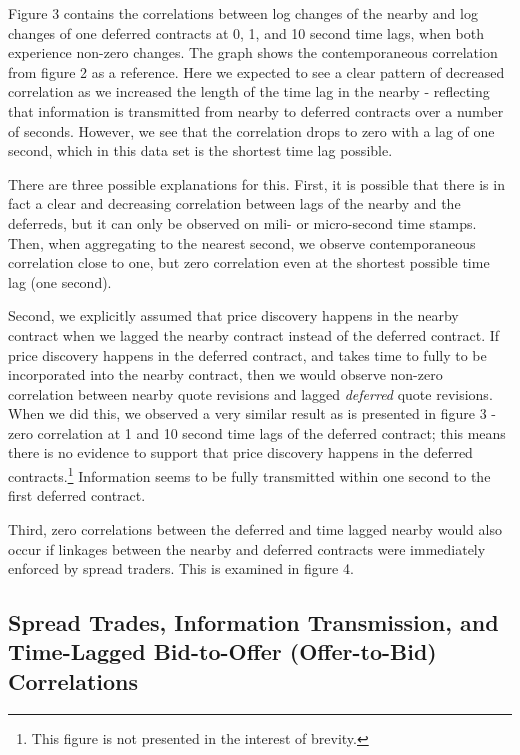 \documentclass[review,12pt]{elsarticle}
\begin{document}
Figure 3 contains the correlations between log changes of the nearby and
log changes of one deferred contracts at 0, 1, and 10 second time lags,
when both experience non-zero changes. The graph shows the
contemporaneous correlation from figure 2 as a reference. Here we
expected to see a clear pattern of decreased correlation as we increased
the length of the time lag in the nearby - reflecting that information
is transmitted from nearby to deferred contracts over a number of
seconds. However, we see that the correlation drops to zero with a lag
of one second, which in this data set is the shortest time lag possible.

There are three possible explanations for this. First, it is possible
that there is in fact a clear and decreasing correlation between lags of
the nearby and the deferreds, but it can only be observed on mili- or
micro-second time stamps. Then, when aggregating to the nearest second,
we observe contemporaneous correlation close to one, but zero
correlation even at the shortest possible time lag (one second).

Second, we explicitly assumed that price discovery happens in the nearby
contract when we lagged the nearby contract instead of the deferred
contract. If price discovery happens in the deferred contract, and takes
time to fully to be incorporated into the nearby contract, then we would
observe non-zero correlation between nearby quote revisions and lagged
\emph{deferred} quote revisions. When we did this, we observed a very
similar result as is presented in figure 3 - zero correlation at 1 and
10 second time lags of the deferred contract; this means there is no
evidence to support that price discovery happens in the deferred
contracts.\footnote{This figure is not presented in the interest of
  brevity.} Information seems to be fully transmitted within one second
to the first deferred contract.

Third, zero correlations between the deferred and time lagged nearby
would also occur if linkages between the nearby and deferred contracts
were immediately enforced by spread traders. This is examined in figure
4.

\subsection{Spread Trades, Information Transmission, and Time-Lagged
Bid-to-Offer (Offer-to-Bid)
Correlations}\label{spread-trades-information-transmission-and-time-lagged-bid-to-offer-offer-to-bid-correlations-1}
\end{document}
